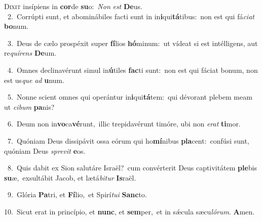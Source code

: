 \lettrine{\initial\textcolor{\initialcolor}{D}}{ixit} insípiens in \textbf{cor}\-de \textbf{su}\-o:~\star \textit{Non} \textit{est} \textbf{De}\-us.\\
{\numbfont\textcolor{\numbcolor}{~2.}}~Corrúpti sunt, et abominábiles facti sunt in in\-\textbf{i}\-qui\-\textbf{tá}\-tibus:~\star non est qui fá\-\textit{ci}\-\textit{at} \textbf{bo}\-num.\par
{\numbfont\textcolor{\numbcolor}{~3.}}~Deus de cælo prospéxit super \textbf{fí}\-lios \textbf{hó}\-minum:~\star ut vídeat si est intélligens, aut re\-\textit{quí}\-\textit{rens} \textbf{De}\-um.\par
{\numbfont\textcolor{\numbcolor}{~4.}}~Omnes declinavérunt simul in\-\textbf{ú}\-tiles \textbf{fac}\-ti sunt:~\star non est qui fáciat bonum, non est us\textit{que} \textit{ad} \textbf{u}\-num.\par
{\numbfont\textcolor{\numbcolor}{~5.}}~Nonne scient omnes qui operántur in\-\textbf{i}\-qui\-\textbf{tá}\-tem:~\star qui dévorant plebem meam ut \textit{ci}\-\textit{bum} \textbf{pa}\-nis?\par
{\numbfont\textcolor{\numbcolor}{~6.}}~Deum non in\-\textbf{vo}\-ca\-\textbf{vé}\-runt,~\star illic trepidavérunt timóre, ubi non \textit{e}\-\textit{rat} \textbf{ti}\-mor.\par
{\numbfont\textcolor{\numbcolor}{~7.}}~Quóniam Deus dissipávit ossa eórum qui ho\-\textbf{mí}\-nibus \textbf{pla}\-cent:~\star confúsi sunt, quóniam Deus \textit{spre}\-\textit{vit} \textbf{e}\-os.\par
{\numbfont\textcolor{\numbcolor}{~8.}}~Quis dabit ex Sion salutáre Israël?~\dagger cum convérterit Deus captivitátem \textbf{ple}\-bis \textbf{su}\-æ,~\star exsultábit Jacob, et lætá\-\textit{bi}\-\textit{tur} \textbf{Is}\-raël.\par
{\numbfont\textcolor{\numbcolor}{~9.}}~Glória \textbf{Pa}\-tri, et \textbf{Fí}\-lio,~\star et Spirí\-\textit{tu}\-\textit{i} \textbf{Sanc}\-to.\par
{\numbfont\textcolor{\numbcolor}{10.}}~Sicut erat in princípio, et \textbf{nunc}\-, et \textbf{sem}\-per,~\star et in sǽcula sæcu\-\textit{ló}\-\textit{rum}. \textbf{A}\-men.\par
